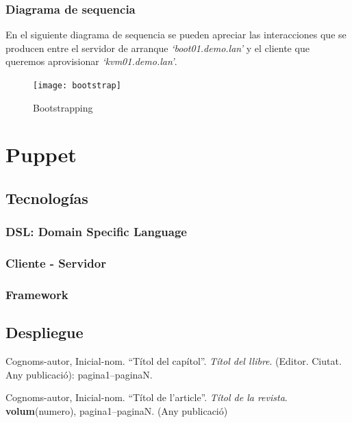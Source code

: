 \documentclass[a4paper,12pt,spanish,final]{epsc_tfc_pfc}
\begin{document}
\subsection{Diagrama de sequencia}
En el siguiente diagrama de sequencia se pueden apreciar las interacciones que se producen entre el servidor de arranque \emph{`boot01.demo.lan'} y el cliente que queremos aprovisionar \emph{`kvm01.demo.lan'}.

\begin{figure}[h]
  \centering
    \texttt{[image: bootstrap]}
      \caption{Bootstrapping}
\end{figure}


\chapter{Puppet}
\section{Tecnologías}
\subsection{DSL: Domain Specific Language}
\subsection{Cliente - Servidor}
\subsection{Framework}
\section{Despliegue}


\begin{thebibliography}{2}


Cognoms-autor, Inicial-nom.
``Títol del capítol''. {\it Títol del llibre}.
(Editor. Ciutat. Any publicació): pagina1--paginaN.

Cognoms-autor, Inicial-nom.
``Títol de l'article''. {\it Títol de la revista}.
{\bf volum}(numero),
pagina1--paginaN. (Any publicació)

\end{thebibliography}
\end{document}
